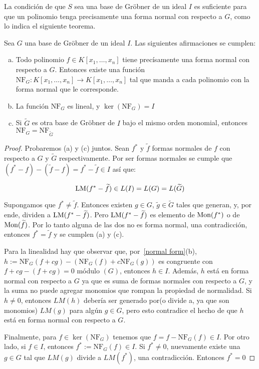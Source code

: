 La condición de que $S$ sea una base de Gröbner de un ideal $I$ es suficiente para que un polinomio tenga precisamente una forma normal con respecto a $G$, como lo indica el siguiente teorema.

\begin{theorem} \label{grobner-normal}
Sea $G$ una base de Gröbner de un ideal $I$. Las siguientes afirmaciones se cumplen:
\begin{enumerate} [(a)]
\item Todo polinomio $f \in K[x_1,\dots,x_n]$ tiene precísamente una forma normal con respecto a $G$. Entonces existe una función $\textrm{NF}_G : K[x_1,\dots,x_n]\rightarrow K[x_1,\dots,x_n]$ tal que manda a cada polinomio con la forma normal que le corresponde.
\item La función $\textrm{NF}_G$ es lineal, y $\ker{(\textrm{NF}_G)} = I$
\item Si $\widetilde{G}$ es otra base de Gröbner de $I$ bajo el mismo orden monomial, entonces $\textrm{NF}_G = \textrm{NF}_{\widetilde{G}}$
\end{enumerate}
\begin{proof}
Probaremos (a) y (c) juntos. Sean $f^*$ y $\widetilde{f}$ formas normales de $f$ con respecto a $G$ y $\widetilde{G}$ respectivamente. Por ser formas normales se cumple que $(f^* - f) - (\widetilde{f} - f) = f^* - \widetilde{f} \in I$ así que:

$$ \textrm{LM}(f^* - \widetilde{f}) \in L(I) = L(G) = L(\widetilde{G}) $$

Supongamos que $f^* \neq \widetilde{f}$. Entonces existen $g \in G$, $\widetilde{g} \in \widetilde{G}$ tales que generan, y, por ende, dividen a $\textrm{LM}(f^* - \widetilde{f})$. Pero $\textrm{LM}(f^* - \widetilde{f})$ es elemento de $\textrm{Mon}(f^*)$ o de $\textrm{Mon}(\widetilde{f})$. Por lo tanto alguna de las dos no es forma normal, una contradicción, entonces $f^* = \widetilde{f}$ y se cumplen (a) y (c).

Para la linealidad hay que observar que, por~\ref{normal form}(b), $h := \textrm{NF}_G(f + cg) - (\textrm{NF}_G(f) + c\textrm{NF}_G(g))$ es congruente con $f + cg - (f + cg) = 0$ módulo $(G)$, entonces $h \in I$. Además, $h$ está en forma normal con respecto a $G$ ya que es suma de formas normales con respecto a $G$, y la suma no puede agregar monomios que rompan la propiedad de normalidad. Si $h \neq 0$, entonces $LM(h)$ debería ser generado por(o divide a, ya que son monomios) $LM(g)$ para algún $g \in G$, pero esto contradice el hecho de que $h$ está en forma normal con respecto a $G$.

Finalmente, para $f \in \ker{(\textrm{NF}_G)}$ tenemos que $f = f - \textrm{NF}_G(f) \in I$. Por otro lado, si $f \in I$, entonces $f^* := \textrm{NF}_G(f) \in I$. Si $f^* \neq 0$, nuevamente existe una $g \in G$ tal que $LM(g)$ divide a $LM(f^*)$, una contradicción. Entonces $f^* =0$
\end{proof}
\end{theorem}


